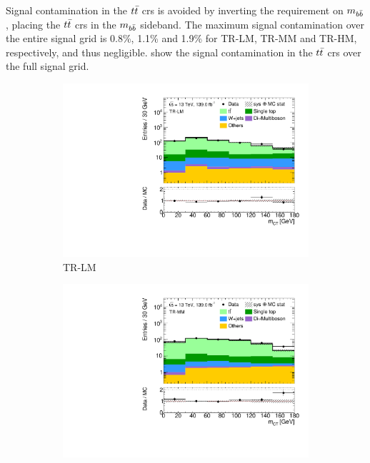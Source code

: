 Signal contamination in the $t\bar{t}$ \glspl{cr} is avoided by inverting the requirement on $m_{b\bar{b}}$, \ie placing the $t\bar{t}$ \glspl{cr} in the $m_{b\bar{b}}$ sideband.
The maximum signal contamination over the entire signal grid is 0.8\%, 1.1\% and 1.9\% for TR-LM, TR-MM and TR-HM, respectively, and thus negligible.  show the signal contamination in the $t\bar{t}$ \glspl{cr} over the full signal grid. 

 \begin{figure}
	\centering
	\begin{subfigure}[b]{0.5\linewidth}
		\centering\includegraphics[width=1.0\textwidth]{1Lbb_TR-LM_mct}
		\caption{TR-LM\label{fig:signal_contamination_TRLM}}
	\end{subfigure}\hfill
	\begin{subfigure}[b]{0.5\linewidth}
		\centering\includegraphics[width=1.0\textwidth]{1Lbb_TR-MM_mct}

\end{subfigure}
\end{figure}
